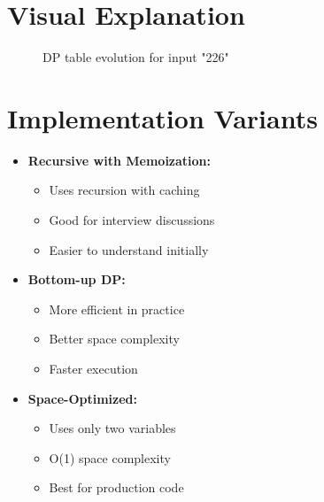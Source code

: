 \section*{Visual Explanation}
\begin{figure}[h]
    \centering
    \caption{DP table evolution for input "226"}
    \label{fig:dp_visualization}
\end{figure}

\section*{Implementation Variants}
\begin{itemize}
    \item \textbf{Recursive with Memoization:}
        \begin{itemize}
            \item Uses recursion with caching
            \item Good for interview discussions
            \item Easier to understand initially
        \end{itemize}
    \item \textbf{Bottom-up DP:}
        \begin{itemize}
            \item More efficient in practice
            \item Better space complexity
            \item Faster execution
        \end{itemize}
    \item \textbf{Space-Optimized:}
        \begin{itemize}
            \item Uses only two variables
            \item O(1) space complexity
            \item Best for production code
        \end{itemize}
\end{itemize}

